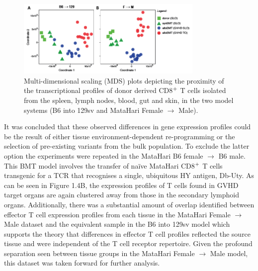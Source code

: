 \begin{figure}[H] 
    \centering
   \includegraphics[width=0.8\textwidth]{Figures/Chapter1/lab_MDS_plot.png}
\caption{\small{Multi-dimensional scaling (MDS) plots depicting the proximity of the transcriptional profiles of donor derived CD8$\textsuperscript{+}$ T cells isolated from the spleen, lymph nodes, blood, gut and skin, in the two model systems (B6 into 129sv and MataHari Female $\to$ Male).} }
    \label{fig:4}
\end{figure}

It was concluded that these observed differences in gene expression profiles could be the result of either tissue environment-dependent re-programming or the selection of pre-existing variants from the bulk population. To exclude the latter option the experiments were repeated in the MataHari B6 female $\to$ B6 male. This BMT model involves the transfer of na\"ive MataHari CD8$\textsuperscript{+}$ T cells transgenic for a TCR that recognises a single, ubiquitous HY antigen, Db-Uty. As can be seen in Figure 1.4B, the expression profiles of T cells found in GVHD target organs are again clustered away from those in the secondary lymphoid organs. Additionally, there was a substantial amount of overlap identified between effector T cell expression profiles from each tissue in the MataHari Female $\to$ Male dataset and the equivalent sample in the B6 into 129sv model which supports the theory that differences in effector T cell profiles reflected the source tissue and were independent of the T cell receptor repertoire. Given the profound separation seen between tissue groups in the MataHari Female $\to$ Male model, this dataset was taken forward for further analysis. 

